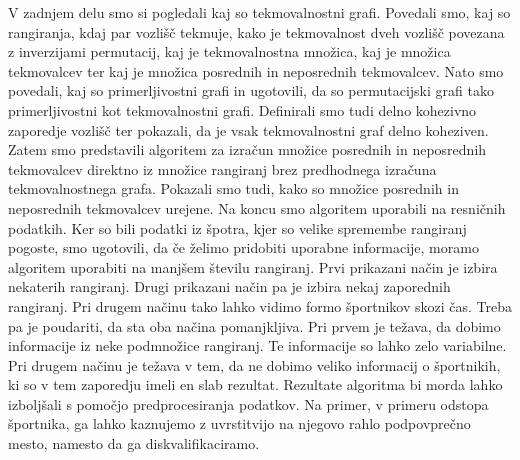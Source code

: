 \documentclass[a4paper, 12pt]{book}
\begin{document}
V zadnjem delu smo si pogledali kaj so tekmovalnostni grafi. Povedali smo, kaj so rangiranja, kdaj par vozlišč tekmuje, kako je tekmovalnost dveh vozlišč povezana z inverzijami permutacij, kaj je tekmovalnostna množica, kaj je množica tekmovalcev ter kaj je množica posrednih in neposrednih tekmovalcev. Nato smo povedali, kaj so primerljivostni grafi in ugotovili, da so permutacijski grafi tako primerljivostni kot tekmovalnostni grafi. Definirali smo tudi delno kohezivno zaporedje vozlišč ter pokazali, da je vsak tekmovalnostni graf delno koheziven. Zatem smo predstavili algoritem za izračun množice posrednih in neposrednih tekmovalcev direktno iz množice rangiranj brez predhodnega izračuna tekmovalnostnega grafa. Pokazali smo tudi, kako so množice posrednih in neposrednih tekmovalcev urejene. Na koncu smo algoritem uporabili na resničnih podatkih. Ker so bili podatki iz špotra, kjer so velike spremembe rangiranj pogoste, smo ugotovili, da če želimo pridobiti uporabne informacije, moramo algoritem uporabiti na manjšem številu rangiranj. Prvi prikazani način je izbira nekaterih rangiranj. Drugi prikazani način pa je izbira nekaj zaporednih rangiranj. Pri drugem načinu tako lahko vidimo formo športnikov skozi čas. Treba pa je poudariti, da sta oba načina pomanjkljiva. Pri prvem je težava, da dobimo informacije iz neke podmnožice rangiranj. Te informacije so lahko zelo variabilne. Pri drugem načinu je težava v tem, da ne dobimo veliko informacij o športnikih, ki so v tem zaporedju imeli en slab rezultat. Rezultate algoritma bi morda lahko izboljšali s pomočjo predprocesiranja podatkov. Na primer, v primeru odstopa športnika, ga lahko kaznujemo z uvrstitvijo na njegovo rahlo podpovprečno mesto, namesto da ga diskvalifikaciramo.

\cleardoublepage
{}


\end{document}
